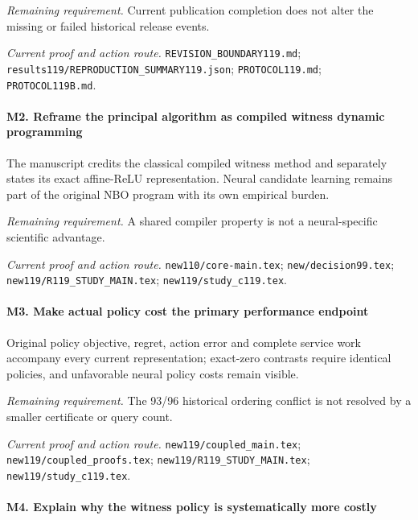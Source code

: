 \par\emph{Remaining requirement.} Current publication completion does not alter the missing or failed historical release events.

\par\emph{Current proof and action route.} \nolinkurl{REVISION_BOUNDARY119.md}; \nolinkurl{results119/REPRODUCTION_SUMMARY119.json}; \nolinkurl{PROTOCOL119.md}; \nolinkurl{PROTOCOL119B.md}.

\paragraph{M2. Reframe the principal algorithm as compiled witness dynamic programming}

The manuscript credits the classical compiled witness method and separately states its exact affine-ReLU representation. Neural candidate learning remains part of the original NBO program with its own empirical burden.

\par\emph{Remaining requirement.} A shared compiler property is not a neural-specific scientific advantage.

\par\emph{Current proof and action route.} \nolinkurl{new110/core-main.tex}; \nolinkurl{new/decision99.tex}; \nolinkurl{new119/R119_STUDY_MAIN.tex}; \nolinkurl{new119/study_c119.tex}.

\paragraph{M3. Make actual policy cost the primary performance endpoint}

Original policy objective, regret, action error and complete service work accompany every current representation; exact-zero contrasts require identical policies, and unfavorable neural policy costs remain visible.

\par\emph{Remaining requirement.} The 93/96 historical ordering conflict is not resolved by a smaller certificate or query count.

\par\emph{Current proof and action route.} \nolinkurl{new119/coupled_main.tex}; \nolinkurl{new119/coupled_proofs.tex}; \nolinkurl{new119/R119_STUDY_MAIN.tex}; \nolinkurl{new119/study_c119.tex}.

\paragraph{M4. Explain why the witness policy is systematically more costly}

